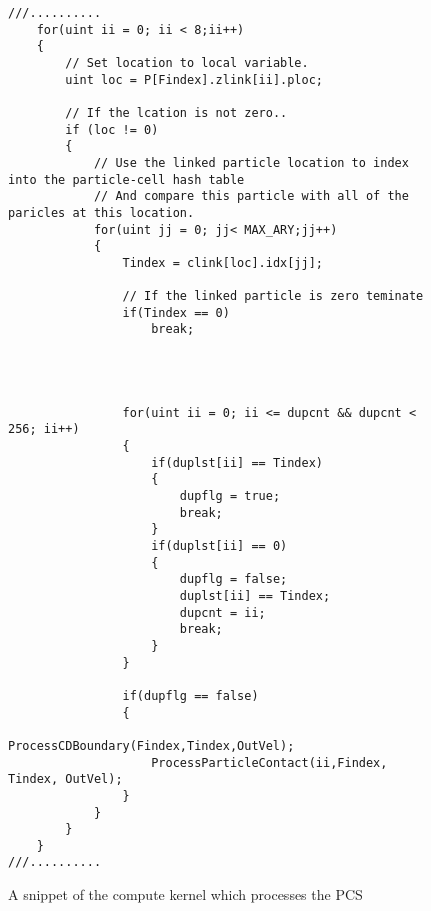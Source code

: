 
\begin{figure}[h]
\centering
\lstset{style=gpucode,linewidth=6.5in,xleftmargin=0.25in}

\begin{lstlisting}
///..........
	for(uint ii = 0; ii < 8;ii++)
	{
		// Set location to local variable.
		uint loc = P[Findex].zlink[ii].ploc;

		// If the lcation is not zero..
		if (loc != 0)
		{
			// Use the linked particle location to index into the particle-cell hash table 
			// And compare this particle with all of the paricles at this location.
			for(uint jj = 0; jj< MAX_ARY;jj++)
			{
				Tindex = clink[loc].idx[jj];

				// If the linked particle is zero teminate
				if(Tindex == 0)
					break;
				
				
					
				
				for(uint ii = 0; ii <= dupcnt && dupcnt < 256; ii++)
				{
					if(duplst[ii] == Tindex)
					{
						dupflg = true;
						break;
					}
					if(duplst[ii] == 0)
					{
						dupflg = false;
						duplst[ii] == Tindex;
						dupcnt = ii;
						break;
					}
				}
										
				if(dupflg == false)						
				{
					ProcessCDBoundary(Findex,Tindex,OutVel);
					ProcessParticleContact(ii,Findex, Tindex, OutVel);
				}
			}
		}
	}
///..........
\end{lstlisting}


\caption[Benchset test configuration file]{A snippet of the compute kernel which processes the PCS }
\label{fig:ParticleComp}
\end{figure}
